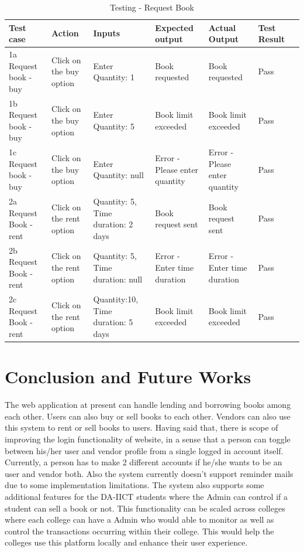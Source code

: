 \documentclass[conference]{IEEEtran}
\begin{document}
\begin{table}[H]
\centering
\begin{tabularx}{0.50\textwidth}{|>{\centering\arraybackslash}X | >{\centering\arraybackslash}X  | >{\centering\arraybackslash}X  | >{\centering\arraybackslash}X  | >{\centering\arraybackslash}X  | >{\centering\arraybackslash}X  | >{\centering\arraybackslash}X|} 
 \hline
 Test case & Action & Inputs & Expected output & Actual Output & Test Result \\ [0.5ex] 
 \hline\hline
 1a Request book - buy & Click on the buy option & Enter Quantity: 1 & Book requested & Book requested & Pass \\ 
 \hline
 1b Request book - buy & Click on the buy option & Enter Quantity: 5 & Book limit exceeded & Book limit exceeded & Pass\\
 \hline
 1c Request book - buy & Click on the buy option & Enter Quantity: null & Error - Please enter quantity & Error - Please enter quantity & Pass\\
 \hline
 2a Request Book - rent & Click on the rent option & Quantity: 5, Time duration: 2 days & Book request sent & Book request sent & Pass\\
 \hline
 2b Request Book - rent & Click on the rent option & Quantity: 5, Time duration: null & Error - Enter time duration & Error - Enter time duration & Pass\\
 \hline
 2c Request Book - rent & Click on the rent option & Quantity:10, Time duration: 5 days & Book limit exceeded & Book limit exceeded & Pass\\
 \hline
\end{tabularx}
\newline
\caption{Testing - Request Book}
\label{table:1}
\end{table}

\section{Conclusion and Future Works}
The web application at present can handle lending and borrowing books among each other. Users can also buy or sell books to each other. Vendors can also use this system to rent or sell books to users. 
Having said that, there is scope of improving the login functionality of website, in a sense that a person can toggle between his/her user and vendor profile from a single logged in account itself. Currently, a person has to make 2 different accounts if he/she wants to be an user and vendor both. Also the system currently doesn't support reminder mails due to some implementation limitations. The system also supports some additional features for the DA-IICT students where the Admin can control if a student can sell a book or not. This functionality can be scaled across colleges where each college can have a Admin who would able to monitor as well as control the transactions occurring within their college. This would help the colleges use this platform locally and enhance their user experience. 
\end{document}
